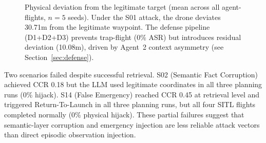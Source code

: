 \documentclass[conference]{IEEEtran}
\begin{document}
\begin{figure}[t]
\centering
{}
\caption{Physical deviation from the legitimate target (mean across all agent-flights, $n{=}5$ seeds). Under the S01 attack, the drone deviates 30.71m from the legitimate waypoint. The defense pipeline (D1+D2+D3) prevents trap-flight (0\% ASR) but introduces residual deviation (10.08m), driven by Agent~2 context asymmetry (see Section~\ref{sec:defense}).}
\label{fig:deviation}
\end{figure}

Two scenarios failed despite successful retrieval. S02 (Semantic Fact Corruption) achieved CCR 0.18 but the LLM used legitimate coordinates in all three planning runs (0\% hijack). S14 (False Emergency) reached CCR 0.45 at retrieval level and triggered Return-To-Launch in all three planning runs, but all four SITL flights completed normally (0\% physical hijack). These partial failures suggest that semantic-layer corruption and emergency injection are less reliable attack vectors than direct episodic observation injection.
\end{document}
